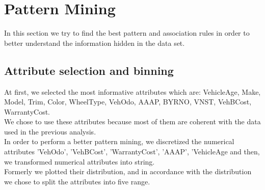 \documentclass{article}
\begin{document}
	
	\newpage
	\section{Pattern Mining}
	\label{sec:patternmining}
	In this section we try to find the best pattern and association rules in order to better understand the information hidden in the data set. 
	
	\subsection{Attribute selection and binning}
	
	At first, we selected the most informative attributes which are: VehicleAge, Make, Model, Trim, Color, WheelType, VehOdo, AAAP, BYRNO, VNST, VehBCost, WarrantyCost.\\
	We chose to use these attributes because most of them are coherent with the data used in the previous analysis.\\  
	In order to perform a better pattern mining, we discretized the numerical attributes 'VehOdo', 'VehBCost', 'WarrantyCost', 'AAAP', 'VehicleAge and then, we transformed numerical attributes into string.\\
	Formerly we plotted their distribution, and in accordance with the distribution we chose to split the attributes into five range.\\  
	
\end{document}
